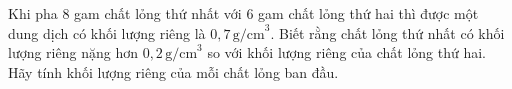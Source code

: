 \begin{practice}
\begin{questions}[resume=SBT]
        \answerline
        \answerline
        \answerline

        \item Khi pha 8 gam chất lỏng thứ nhất với 6 gam chất lỏng thứ hai thì được một dung dịch có khối lượng riêng là $0{,}7\,\text{g/cm}^3$. Biết rằng chất lỏng thứ nhất có khối lượng riêng nặng hơn $0{,}2\,\text{g/cm}^3$ so với khối lượng riêng của chất lỏng thứ hai. Hãy tính khối lượng riêng của mỗi chất lỏng ban đầu.

        \answerline
        \answerline
        \answerline
    \end{questions}
\end{practice}
